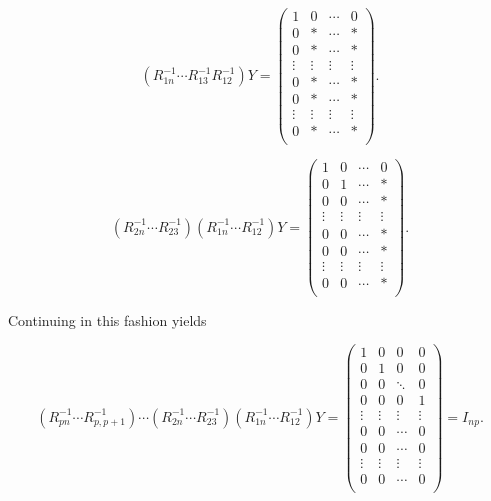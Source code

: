 \documentclass{article}
\begin{document}
\begin{equation}
(R_{1n}^{-1} \cdots R_{13}^{-1} R_{12}^{-1}) Y 
=
\begin{pmatrix}
1 & 0 & \cdots & 0\\
0 & * & \cdots & *\\
0 & * & \cdots & *\\
\vdots & \vdots & \vdots & \vdots\\
0 & * & \cdots & *\\
0 & * & \cdots & *\\
\vdots & \vdots & \vdots & \vdots\\
0 & * & \cdots & *\\
\end{pmatrix}.
\end{equation}

\begin{equation}
(R_{2n}^{-1} \cdots R_{23}^{-1})
(R_{1n}^{-1} \cdots R_{12}^{-1}) Y 
=
\begin{pmatrix}
1 & 0 & \cdots & 0\\
0 & 1 & \cdots & *\\
0 & 0 & \cdots & *\\
\vdots & \vdots & \vdots & \vdots\\
0 & 0 & \cdots & *\\
0 & 0 & \cdots & *\\
\vdots & \vdots & \vdots & \vdots\\
0 & 0 & \cdots & *\\
\end{pmatrix}.
\end{equation}

Continuing in this fashion yields

\begin{equation}
(R_{pn}^{-1} \cdots R_{p,p+1}^{-1})
\cdots
(R_{2n}^{-1} \cdots R_{23}^{-1})
(R_{1n}^{-1} \cdots R_{12}^{-1}) Y 
=
\begin{pmatrix}
1 & 0 & 0 & 0\\
0 & 1 & 0 & 0\\
0 & 0 & \ddots & 0\\
0 & 0 & 0 & 1\\
\vdots & \vdots & \vdots & \vdots\\
0 & 0 & \cdots & 0\\
0 & 0 & \cdots & 0\\
\vdots & \vdots & \vdots & \vdots\\
0 & 0 & \cdots & 0\\
\end{pmatrix}
=
I_{np}.
\end{equation}
\end{document}
